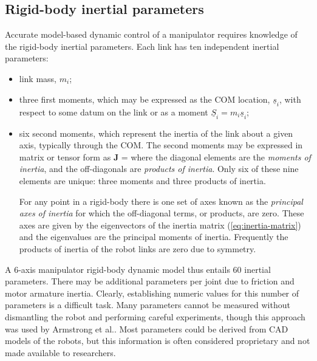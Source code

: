 \documentclass{article}
\newcommand{\DEF}[1]{{\it#1}}
\newcommand{\eq}[1]{(\ref{#1})}
\newcommand{\etal}{{et al.}}
\renewcommand{\vec}[1]{\underline{#1}}
\begin{document}
\subsection{Rigid-body inertial parameters} \label{sec:robot-rigidbody-params}
Accurate model-based dynamic control of a manipulator requires knowledge of the
rigid-body inertial parameters.
Each link has ten independent  inertial parameters:
\begin{itemize}
\item link mass, $m_i$;
\item three first moments, which may be expressed
as the COM location, $\vec{s}_i$, with respect to some datum on the link
or as a moment $\vec{S}_i = m_i \vec{s}_i$;
\item six second moments, which represent the inertia of the link about a
given axis, typically through the COM.
The second moments may be expressed in matrix or tensor form as
\be
{\bf J} = 		\label{eq:inertia-matrix}
\ee
where the diagonal elements are the \DEF{moments of inertia}, and the
off-diagonals are \DEF{products of inertia}.
Only six of these nine elements are unique:
three moments and three products of inertia.

For any point in a rigid-body there is one set of axes known as the
\DEF{principal axes of inertia} for which the off-diagonal terms, or products, are
zero.  These axes are given by the eigenvectors of the
inertia matrix \eq{eq:inertia-matrix} and the eigenvalues are the principal moments of
inertia.  Frequently the products of inertia of the robot links are zero due 
to symmetry.
\end{itemize}

A 6-axis manipulator rigid-body dynamic model thus entails 60 
inertial parameters.
There may be additional parameters per joint due to friction and motor 
armature inertia.  
Clearly, establishing numeric values for this number of parameters is a difficult task.
Many parameters cannot be measured without dismantling the robot and performing
careful experiments, though this approach was used by Armstrong \etal\cite{Armstrong86}.
Most parameters could be derived from CAD models of the robots, but this information
is often considered proprietary and not made available to researchers.



\end{document}
